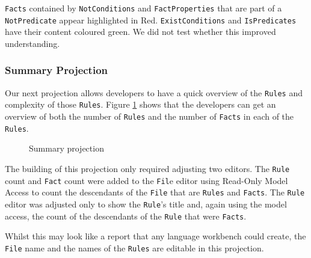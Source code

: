 \texttt{Facts} contained by \texttt{NotConditions} and \texttt{FactProperties} that are part of a \texttt{NotPredicate} appear highlighted in Red.
\texttt{ExistConditions} and \texttt{IsPredicates} have their content coloured green.
We did not test whether this improved understanding.

\subsubsection{Summary Projection}

Our next projection allows developers to have a quick overview of the \texttt{Rules} and complexity of those \texttt{Rules}.
Figure \ref{fig:summaryProjection} shows that the developers can get an overview of both the number of \texttt{Rules} and the number of \texttt{Facts} in each of the \texttt{Rules}.

\begin{figure}
    \centering
    \caption{Summary projection}
    \label{fig:summaryProjection}
\end{figure}

The building of this projection only required adjusting two editors.
The \texttt{Rule} count and \texttt{Fact} count were added to the \texttt{Fil}e editor using Read-Only Model Access to count the descendants of the \texttt{File} that are \texttt{Rules} and \texttt{Facts}.
The \texttt{Rule} editor was adjusted only to show the \texttt{Rule}'s title and, again using the model access, the count of the descendants of the \texttt{Rule} that were \texttt{Facts}.

Whilst this may look like a report that any language workbench could create, the \texttt{File} name and the names of the \texttt{Rules} are editable in this projection.

